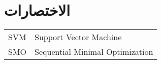 

\chapter*{الاختصارات}

\begin{doublespacing}
	\begin{center}
		\begin{english}
			\begin{tabular}{l l}
				
				\indent
				SVM		&		Support Vector Machine \\
				
				\indent
				SMO		&		Sequential Minimal Optimization \\
				
			\end{tabular}
		\end{english}
	\end{center}
\end{doublespacing}

